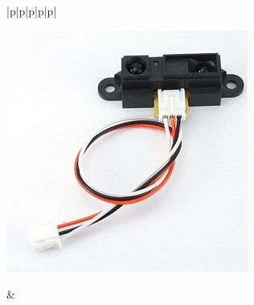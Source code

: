 \begin{table}[H]
\begin{tabular}{|p{\colA}|p{\colB}|p{\colC}|p{\colD}|p{\colE}|}
\begin{minipage}[t]{\linewidth}
    \smallskip
      \centering
      \includegraphics[width=0.8\linewidth]{images/chap05/text05-img023.jpg}
      \smallskip
    \end{minipage} &
    \pageref{distance}\\ \hline   
  \end{tabular}
\end{table}

